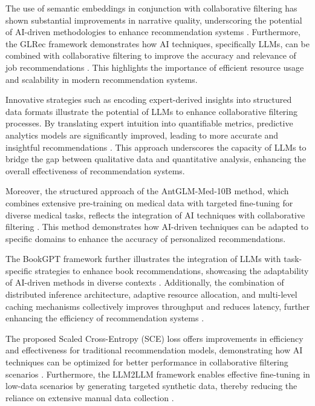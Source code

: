 The use of semantic embeddings in conjunction with collaborative filtering has shown substantial improvements in narrative quality, underscoring the potential of AI-driven methodologies to enhance recommendation systems \cite{sayana2024retrievalgeneratingnarrativesconversational}. Furthermore, the GLRec framework demonstrates how AI techniques, specifically LLMs, can be combined with collaborative filtering to improve the accuracy and relevance of job recommendations \cite{wu2023exploringlargelanguagemodel}. This highlights the importance of efficient resource usage and scalability in modern recommendation systems.

Innovative strategies such as encoding expert-derived insights into structured data formats illustrate the potential of LLMs to enhance collaborative filtering processes. By translating expert intuition into quantifiable metrics, predictive analytics models are significantly improved, leading to more accurate and insightful recommendations \cite{jing2024translatingexpertintuitionquantifiable}. This approach underscores the capacity of LLMs to bridge the gap between qualitative data and quantitative analysis, enhancing the overall effectiveness of recommendation systems.

Moreover, the structured approach of the AntGLM-Med-10B method, which combines extensive pre-training on medical data with targeted fine-tuning for diverse medical tasks, reflects the integration of AI techniques with collaborative filtering \cite{li2024beginnerexpertmodelingmedical}. This method demonstrates how AI-driven techniques can be adapted to specific domains to enhance the accuracy of personalized recommendations.

The BookGPT framework further illustrates the integration of LLMs with task-specific strategies to enhance book recommendations, showcasing the adaptability of AI-driven methods in diverse contexts \cite{zhiyuli2023bookgptgeneralframeworkbook}. Additionally, the combination of distributed inference architecture, adaptive resource allocation, and multi-level caching mechanisms collectively improves throughput and reduces latency, further enhancing the efficiency of recommendation systems \cite{zhang2024llm}.

The proposed Scaled Cross-Entropy (SCE) loss offers improvements in efficiency and effectiveness for traditional recommendation models, demonstrating how AI techniques can be optimized for better performance in collaborative filtering scenarios \cite{xu2024llmbasedrecommendersbestsimple}. Furthermore, the LLM2LLM framework enables effective fine-tuning in low-data scenarios by generating targeted synthetic data, thereby reducing the reliance on extensive manual data collection \cite{lee2024llm2llmboostingllmsnovel}.

